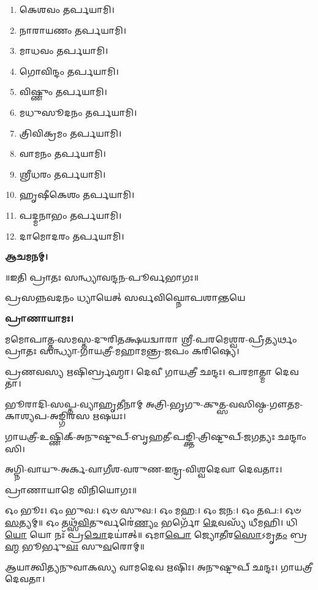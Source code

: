 
\begin{enumerate}
\item 𑌕𑍇𑌶𑌵𑌂 𑌤𑌰𑍍𑌪𑌯𑌾𑌮𑌿।
\item 𑌨𑌾𑌰𑌾𑌯𑌣𑌂 𑌤𑌰𑍍𑌪𑌯𑌾𑌮𑌿।
\item 𑌮𑌾𑌧𑌵𑌂 𑌤𑌰𑍍𑌪𑌯𑌾𑌮𑌿।
\item 𑌗𑍋𑌵𑌿𑌨𑍍𑌦𑌂 𑌤𑌰𑍍𑌪𑌯𑌾𑌮𑌿।
\item 𑌵𑌿𑌷𑍍𑌣𑍁𑌂 𑌤𑌰𑍍𑌪𑌯𑌾𑌮𑌿।
\item 𑌮𑌧𑍁𑌸𑍂𑌦𑌨𑌂 𑌤𑌰𑍍𑌪𑌯𑌾𑌮𑌿।
\item 𑌤𑍍𑌰𑌿𑌵𑌿𑌕𑍍𑌰𑌮𑌂 𑌤𑌰𑍍𑌪𑌯𑌾𑌮𑌿।
\item 𑌵𑌾𑌮𑌨𑌂 𑌤𑌰𑍍𑌪𑌯𑌾𑌮𑌿।
\item 𑌶𑍍𑌰𑍀𑌧𑌰𑌂 𑌤𑌰𑍍𑌪𑌯𑌾𑌮𑌿।
\item 𑌹𑍃𑌷𑍀𑌕𑍇𑌶𑌂 𑌤𑌰𑍍𑌪𑌯𑌾𑌮𑌿।
\item 𑌪𑌦𑍍𑌮𑌨𑌾𑌭𑌂 𑌤𑌰𑍍𑌪𑌯𑌾𑌮𑌿।
\item 𑌦𑌾𑌮𑍋𑌦𑌰𑌂 𑌤𑌰𑍍𑌪𑌯𑌾𑌮𑌿।
\end{enumerate}

\textbf{𑌆𑌚𑌮𑌨𑌮𑍍।}


\centerline{॥𑌇𑌤𑌿 𑌪𑍍𑌰𑌾𑌤𑌃 𑌸𑌨𑍍𑌧𑍍𑌯𑌾𑌵𑌨𑍍𑌦𑌨-𑌪𑍂𑌰𑍍𑌵𑌭𑌾𑌗𑌃॥}



{𑌪𑍍𑌰𑌸𑌨𑍍𑌨𑌵𑌦𑌨𑌂 𑌧𑍍𑌯𑌾𑌯𑍇𑌤𑍍 𑌸𑌰𑍍𑌵𑌵𑌿𑌘𑍍𑌨𑍋𑌪𑌶𑌾𑌨𑍍𑌤𑌯𑍇}

\textbf{𑌪𑍍𑌰𑌾𑌣𑌾𑌯𑌾𑌮𑌃।}

𑌮𑌮𑍋𑌪𑌾𑌤𑍍𑌤-𑌸𑌮𑌸𑍍𑌤-𑌦𑍁𑌰𑌿𑌤𑌕𑍍𑌷𑌯𑌦𑍍𑌵𑌾𑌰𑌾 𑌶𑍍𑌰𑍀-𑌪𑌰𑌮𑍇𑌶𑍍𑌵𑌰-𑌪𑍍𑌰𑍀𑌤𑍍𑌯𑌰𑍍𑌥𑌂 𑌪𑍍𑌰𑌾𑌤𑌃 𑌸𑌨𑍍𑌧𑍍𑌯𑌾-𑌗𑌾𑌯𑌤𑍍𑌰𑍀-𑌮𑌹𑌾𑌮𑌨𑍍𑌤𑍍𑌰-𑌜𑌪𑌂 𑌕𑌰𑌿𑌷𑍍𑌯𑍇।


𑌪𑍍𑌰𑌣𑌵𑌸𑍍𑌯 𑌋𑌷𑌿𑌰𑍍𑌬𑍍𑌰𑌹𑍍𑌮𑌾।
𑌦𑍇𑌵𑍀 𑌗𑌾𑌯𑌤𑍍𑌰𑍀 𑌛𑌨𑍍𑌦𑌃।
𑌪𑌰𑌮𑌾𑌤𑍍𑌮𑌾 𑌦𑍇𑌵𑌤𑌾।

𑌭𑍂𑌰𑌾𑌦𑌿-𑌸𑌪𑍍𑌤-𑌵𑍍𑌯𑌾𑌹𑍃𑌤𑍀𑌨𑌾𑌮𑍍 𑌅𑌤𑍍𑌰𑌿-𑌭𑍃𑌗𑍁-𑌕𑍁𑌤𑍍𑌸-𑌵𑌸𑌿𑌷𑍍𑌠-𑌗𑍗𑌤𑌮-𑌕𑌾𑌶𑍍𑌯𑌪-𑌅𑌙𑍍𑌗𑌿𑌰𑌸 𑌋𑌷𑌯𑌃।

𑌗𑌾𑌯𑌤𑍍𑌰𑍀-𑌉𑌷𑍍𑌣𑌿𑌕𑍍-𑌅𑌨𑍁𑌷𑍍𑌟𑍁𑌪𑍍-𑌬𑍃𑌹𑌤𑍀-𑌪𑌙𑍍𑌕𑍍𑌤𑌿-𑌤𑍍𑌰𑌿𑌷𑍍𑌟𑍁𑌪𑍍-𑌜𑌗𑌤𑍍𑌯𑌃 𑌛𑌨𑍍𑌦𑌾𑌂𑌸𑌿।

𑌅𑌗𑍍𑌨𑌿-𑌵𑌾𑌯𑍁-𑌅𑌰𑍍𑌕-𑌵𑌾𑌗𑍀𑌶-𑌵𑌰𑍁𑌣-𑌇𑌨𑍍𑌦𑍍𑌰-𑌵𑌿𑌶𑍍𑌵𑌦𑍇𑌵𑌾 𑌦𑍇𑌵𑌤𑌾𑌃।
      
𑌪𑍍𑌰𑌾𑌣𑌾𑌯𑌾𑌮𑍇 𑌵𑌿𑌨𑌿𑌯𑍋𑌗𑌃॥


𑌓𑌂 𑌭𑍂𑌃। 𑌓𑌂 𑌭𑍁𑌵:। 𑌓𑍞 𑌸𑍁𑌵:। 𑌓𑌂 𑌮𑌹:। 𑌓𑌂 𑌜𑌨:। 𑌓𑌂 𑌤𑌪:। 𑌓𑍞 \ul{𑌸}\-𑌤𑍍𑌯𑌮𑍍॥
𑌓𑌂 𑌤𑌥𑍍𑌸᳴\-\ul{𑌵𑌿}\-𑌤𑍁𑌰𑍍𑌵𑌰𑍇॑\-\ul{𑌣𑍍𑌯𑌂} 𑌭𑌰𑍍𑌗𑍋᳴ \ul{𑌦𑍇}\-𑌵𑌸𑍍𑌯᳴ 𑌧𑍀𑌮𑌹𑌿। 𑌧𑌿\-\ul{𑌯𑍋} 𑌯𑍋 𑌨𑌃᳴ 𑌪𑍍𑌰\-\ul{𑌚𑍋}\-𑌦𑌯𑌾॑𑌤𑍍॥
𑌓𑌮𑌾\-\ul{𑌪𑍋} 𑌜𑍍𑌯𑍋\-\ul{𑌤𑍀}\-𑌰\-\ul{𑌸𑍋}\-𑌽𑌮𑍃\-\ul{𑌤𑌂} 𑌬𑍍𑌰\-\ul{𑌹𑍍𑌮} 𑌭𑍂𑌰𑍍𑌭𑍁\-\ul{𑌵𑌃} 𑌸𑍁\-\ul{𑌵}\-𑌰𑍋𑌮𑍍॥




𑌆𑌯𑌾𑌤𑍍𑌵𑌿𑌤𑍍𑌯𑌨𑍁𑌵𑌾𑌕𑌸𑍍𑌯 𑌵𑌾𑌮𑌦𑍇𑌵 𑌋𑌷𑌿𑌃।
𑌅𑌨𑍁𑌷𑍍𑌟𑍁𑌪𑍍 𑌛𑌨𑍍𑌦𑌃।
𑌗𑌾𑌯𑌤𑍍𑌰𑍀 𑌦𑍇𑌵𑌤𑌾।


